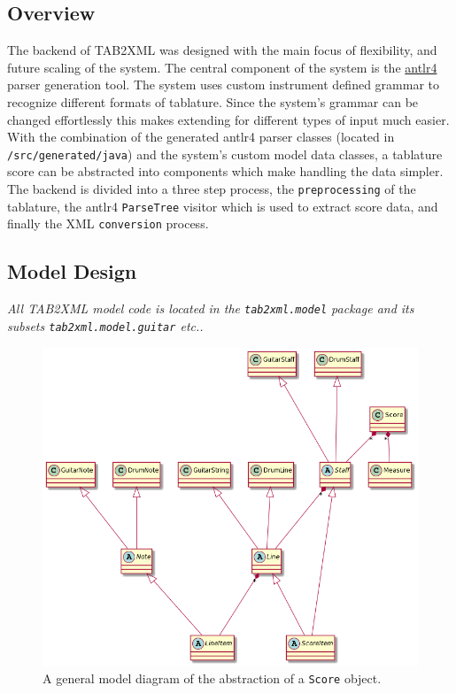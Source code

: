 \documentclass[11pt]{article}
\begin{document}
\subsection{Overview}
\label{sec:org78397c8}
The backend of TAB2XML was designed with the main focus of flexibility, and future scaling of the system. The central component of the system is the \href{https://www.antlr.org/}{antlr4} parser generation tool. The system uses custom instrument defined grammar to recognize different formats of tablature. Since the system's grammar can be changed effortlessly this makes extending for different types of input much easier. With the combination of the generated antlr4 parser classes (located in \texttt{/src/generated/java}) and the system's custom model data classes, a tablature score can be abstracted into components which make handling the data simpler. The backend is divided into a three step process, the \texttt{preprocessing} of the tablature, the antlr4 \texttt{ParseTree} visitor which is used to extract score data, and finally the XML \texttt{conversion} process.

\subsection{Model Design}
\label{sec:org94f1f18}
\emph{All TAB2XML model code is located in the \texttt{tab2xml.model} package and its subsets \texttt{tab2xml.model.guitar} etc..}
\begin{figure}[htbp]
\centering
\includegraphics[width=.9\linewidth]{./Diagrams/backend-model-abstraction.png}
\caption{A general model diagram of the abstraction of a \texttt{Score} object.}
\end{figure}
\end{document}
